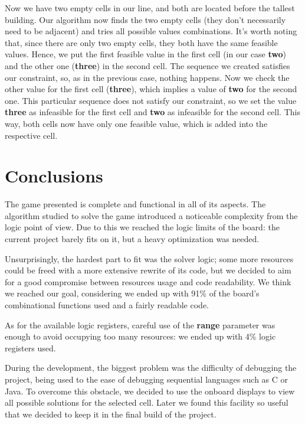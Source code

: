 \documentclass[12pt]{report}
\begin{document}
Now we have two empty cells in our line, and both are located before the tallest
building. Our algorithm now finds the two empty cells (they don't necessarily need
to be adjacent) and tries all possible values combinations. It's worth noting that,
since there are only two empty cells, they both have the same feasible values. Hence,
we put the first feasible value in the first cell (in our case \textbf{two}) and
the other one (\textbf{three}) in the second cell. The sequence we created
satisfies our constraint, so, as in the previous case, nothing happens. Now
we check the other value for the first cell (\textbf{three}), which implies a
value of \textbf{two} for the second one. This particular sequence does not
satisfy our constraint, so we set the value \textbf{three} as infeasible for
the first cell and \textbf{two} as infeasible for the second cell. This way,
both cells now have only one feasible value, which is added into the respective
cell.

\chapter*{Conclusions}

The game presented is complete and functional in all of its aspects. The
algorithm studied to solve the game introduced a noticeable complexity
from the logic point of view. Due to this we reached the logic limits of
the board: the current project barely fits on it, but a heavy optimization
was needed.

Unsurprisingly, the hardest part to fit was the solver logic; some more
resources could be freed with a more extensive rewrite of its code, but we
decided to aim for a good compromise between resources usage and code readability.
We think we reached our goal, considering we ended up with 91\% of the board's
combinational functions used and a fairly readable code.

As for the available logic registers, careful use of the \textbf{range} parameter
was enough to avoid occupying too many resources: we ended up with 4\% logic
registers used.

During the development, the biggest problem was the difficulty of debugging the
project, being used to the ease of debugging sequential languages such as C or Java.
To overcome this obstacle, we decided to use the onboard displays to view all
possible solutions for the selected cell. Later we found this facility so useful
that we decided to keep it in the final build of the project.
\end{document}
